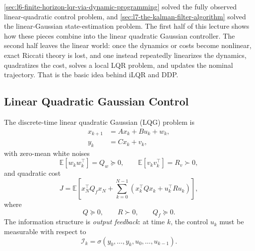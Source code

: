 \label{lec:l8}

\begin{intuition}
	\autoref{sec:l6-finite-horizon-lqr-via-dynamic-programming} solved the fully observed linear-quadratic control problem, and \autoref{sec:l7-the-kalman-filter-algorithm} solved the linear-Gaussian state-estimation problem. The first half of this lecture shows how these pieces combine into the linear quadratic Gaussian controller. The second half leaves the linear world: once the dynamics or costs become nonlinear, exact Riccati theory is lost, and one instead repeatedly linearizes the dynamics, quadratizes the cost, solves a local LQR problem, and updates the nominal trajectory. That is the basic idea behind iLQR and DDP.
\end{intuition}

\subsection{Linear Quadratic Gaussian Control}
\label{sec:l8-linear-quadratic-gaussian-control}

\begin{definition}\label{def:l8-discrete-time-lqg-problem}
	The discrete-time linear quadratic Gaussian (LQG) problem is
	\begin{align*}
		x_{k+1} &= A x_k + B u_k + w_k, \\
		y_k &= C x_k + v_k,
	\end{align*}
	with zero-mean white noises
	\[
		\mathbb{E}[w_k w_k^\top]=Q_w \succeq 0,
		\qquad
		\mathbb{E}[v_k v_k^\top]=R_v \succ 0,
	\]
	and quadratic cost
	\[
		J
		=
		\mathbb{E}\left[
		x_N^\top Q_f x_N
		+
		\sum_{k=0}^{N-1}\left(x_k^\top Q x_k + u_k^\top R u_k\right)
		\right],
	\]
	where
	\[
		Q \succeq 0,
		\qquad
		R \succ 0,
		\qquad
		Q_f \succeq 0.
	\]
	The information structure is \emph{output feedback}: at time $k$, the control $u_k$ must be measurable with respect to
	\[
		\mathcal{I}_k = \sigma(y_0,\dots,y_k,u_0,\dots,u_{k-1}).
	\]
\end{definition}

